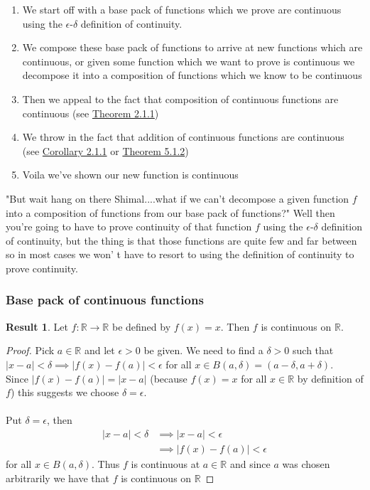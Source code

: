 \documentclass[12pt]{article}
\theoremstyle{definition}
\numberwithin{theorem}{subsection}
\numberwithin{corollary}{subsection}
\newtheorem{result}{Result}
\theoremstyle{remark}
\theoremstyle{point}
\begin{document}
	 
	 \begin{enumerate}
	 	\item We start off with a base pack of functions which we prove are continuous using the  $\epsilon$-$\delta$ definition of continuity. 
	 	\item We compose these base pack of functions to arrive at new functions which are continuous, or given some function which we want to prove is continuous we decompose it into a composition of functions which we know to be continuous
	 	\item Then we appeal to the fact that composition of continuous functions are continuous (see \hyperlink{composition-continuity}{Theorem 2.1.1})
	 	\item We throw in the fact that addition of continuous functions are continuous (see \hyperlink{operations-cont}{Corollary 2.1.1} or \hyperlink{multi-operations-cont}{Theorem 5.1.2})
	 	\item Voila we've shown our new function is continuous
	 \end{enumerate}
	 
	 "But wait hang on there Shimal....what if we can't decompose a given function $f$ into a composition of functions from our base pack of functions?" Well then you're going to have to prove continuity of that function $f$ using the $\epsilon$-$\delta$ definition of continuity, but the thing is that those functions are quite few and far between so in most cases we won' t have to resort to using the definition of continuity to prove continuity.
	 
	 \subsubsection{Base pack of continuous functions}
	 
	 \begin{result}
	 	Let $f : \mathbb{R} \to \mathbb{R}$ be defined by $f(x) = x$. Then $f$ is continuous on $\mathbb{R}$. 
	 \end{result}
	 
	 \begin{proof}
	 	Pick $a \in \mathbb{R}$ and let $\epsilon > 0$ be given. We need to find a $\delta > 0$ such that $|x-a| < \delta \implies |f(x)-f(a)| < \epsilon$ for all $x \in B(a, \delta) = (a- \delta, a+ \delta)$. \\
	 	
	 	Since $|f(x) - f(a)| = |x-a|$ (because $f(x) =  x$ for all $x \in \mathbb{R}$ by definition of $f$) this suggests we choose $\delta = \epsilon$. \\ \\
	 	Put $\delta = \epsilon$, then 	 	\begin{align*}	 	
		 	|x-a| < \delta &\implies |x-a| < \epsilon \\
		 	&\implies  |f(x) - f(a)| < \epsilon
	 	\end{align*}
	 	for all $x \in B(a, \delta)$. Thus $f$ is continuous at $a \in \mathbb{R}$ and since $a$ was chosen arbitrarily we have that $f$ is continuous on $\mathbb{R}$
	 \end{proof}
	 
\end{document}
